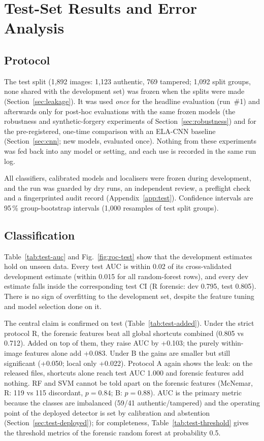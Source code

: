 \section{Test-Set Results and Error Analysis}\label{sec:test}

\subsection{Protocol}\label{sec:test-protocol}
The test split (1,892 images: 1,123 authentic, 769 tampered; 1,092 split groups, none shared with the
development set) was frozen when the splits were made (Section~\ref{sec:leakage}). It was used \emph{once} for the
headline evaluation (run~\#1) and afterwards only for post-hoc evaluations with the same frozen models (the
robustness and synthetic-forgery experiments of Section~\ref{sec:robustness}) and for the pre-registered, one-time
comparison with an ELA-CNN baseline (Section~\ref{sec:cnn}; new models, evaluated once). Nothing from these
experiments was fed back into any model or setting, and each use is recorded in the same run log.

All classifiers, calibrated models and localisers were frozen during development, and the run was guarded by dry
runs, an independent review, a preflight check and a fingerprinted audit record (Appendix~\ref{app:test}).
Confidence intervals are 95\,\% group-bootstrap intervals (1,000 resamples of test split groups).

\subsection{Classification}\label{sec:test-classification}
Table~\ref{tab:test-auc} and Fig.~\ref{fig:roc-test} show that the development estimates hold on unseen data.
Every test AUC is within 0.02 of its cross-validated development estimate (within 0.015 for all random-forest
rows), and every dev estimate falls inside the corresponding test CI (R forensic: dev 0.795, test
0.805). There is no sign of overfitting to the development set, despite the feature tuning and
model selection done on it.

The central claim is confirmed on test (Table~\ref{tab:test-added}). Under the strict protocol R, the forensic
features beat all global shortcuts combined (0.805 vs 0.712). Added on top of them, they raise AUC by
+0.103; the purely within-image features alone add +0.083. Under B the gains
are smaller but still significant (+0.050; local only +0.022). Protocol A again shows the leak:
on the released files, shortcuts alone reach test AUC 1.000 and forensic features add nothing. RF and SVM cannot
be told apart on the forensic features (McNemar, R: 119 vs 115 discordant, $p=0.84$; B: $p=0.88$).
AUC is the primary metric because the classes are imbalanced (59/41 authentic/tampered) and the operating point
of the deployed detector is set by calibration and abstention (Section~\ref{sec:test-deployed}); for completeness,
Table~\ref{tab:test-threshold} gives the threshold metrics of the forensic random forest at probability 0.5.



